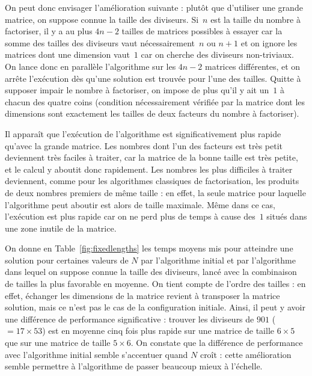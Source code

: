 On  peut donc  envisager l'amélioration  suivante  : plutôt  que d'utiliser  une
grande matrice, on suppose connue la  taille des diviseurs. Si~$n$ est la taille
du nombre à  factoriser, il y a  au plus $4n-2$ tailles de  matrices possibles à
essayer car la somme des  tailles des diviseurs vaut nécessairement~$n$ ou $n+1$
et  on ignore  les  matrices dont  une  dimension vaut~$1$  car  on cherche  des
diviseurs non-triviaux. On  lance donc en parallèle l'algorithme  sur les $4n-2$
matrices différentes, et  on arrête l'exécution dès qu'une  solution est trouvée
pour l'une  des tailles.  Quitte  à supposer impair  le nombre à  factoriser, on
impose  de  plus  qu'il y  ait  un~$1$  à  chacun  des quatre  coins  (condition
nécessairement vérifiée par  la matrice dont les dimensions  sont exactement les
tailles de deux facteurs du nombre à factoriser).

Il apparaît  que l'exécution de  l'algorithme est significativement  plus rapide
qu'avec la  grande matrice. Les  nombres dont l'un  des facteurs est  très petit
deviennent très  faciles à traiter, car la  matrice de la bonne  taille est très
petite, et le calcul y aboutit  donc rapidement. Les nombres les plus difficiles
à traiter  deviennent, comme pour  les algorithmes classiques  de factorisation,
les  produits de  deux nombres  premiers de  même taille  : en  effet,  la seule
matrice   pour  laquelle  l'algorithme   peut  aboutir   est  alors   de  taille
maximale. Même dans ce  cas, l'exécution est plus rapide car on  ne perd plus de
temps à cause des~$1$ situés dans une zone inutile de la
matrice. %

On donne en Table~\ref{fig:fixedlengths} les temps moyens mis pour atteindre une
solution  pour  certaines  valeurs  de  $N$  par  l'algorithme  initial  et  par
l'algorithme dans lequel  on suppose connue la taille  des diviseurs, lancé avec
la  combinaison de  tailles la  plus favorable  en moyenne.  On tient  compte de
l'ordre des tailles : en effet,  échanger les dimensions de la matrice revient à
transposer la  matrice solution, mais  ce n'est pas  le cas de  la configuration
initiale. Ainsi, il  peut y avoir une différence  de performance significative :
trouver les diviseurs  de $901$ ($=17 \times 53$) est en  moyenne cinq fois plus
rapide sur une  matrice de taille $6\times  5$ que sur une matrice  de taille $5
\times  6$.  On  constate que  la  différence de  performance avec  l'algorithme
initial semble s'accentuer quand $N$ croît : cette amélioration semble permettre
à l'algorithme de passer beaucoup mieux à l'échelle.

